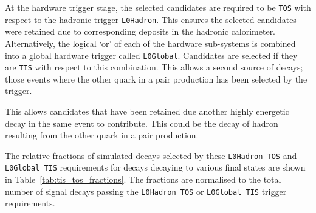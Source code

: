 At the hardware trigger stage, the selected candidates are required to be \texttt{TOS} with respect to the hadronic trigger \texttt{L0Hadron}. This ensures the selected candidates were retained due to corresponding deposits in the hadronic calorimeter. 
Alternatively, the logical `or' of each of the hardware sub-systems is combined into a global hardware trigger called \texttt{L0Global}.
Candidates are selected if they are \texttt{TIS} with respect to this combination.
This allows a second source of decays; those events where the other \bquark quark in a \bquark\bquarkbar pair production has been selected by the trigger. 


This allows candidates that have been retained due another highly energetic decay in the same event to contribute. This could be the decay of hadron resulting from the other \bquark quark in a \bquark\bquarkbar pair production. 

The relative fractions of simulated decays selected by these \texttt{L0Hadron TOS} and \texttt{L0Global TIS} requirements for \decay{\Bp}{\Dsp\phiz} decays decaying to various \Dsp final states are shown in Table~\ref{tab:tis_tos_fractions}. The fractions are normalised to the total number of signal decays passing the \texttt{L0Hadron TOS} or \texttt{L0Global TIS} trigger requirements. 

